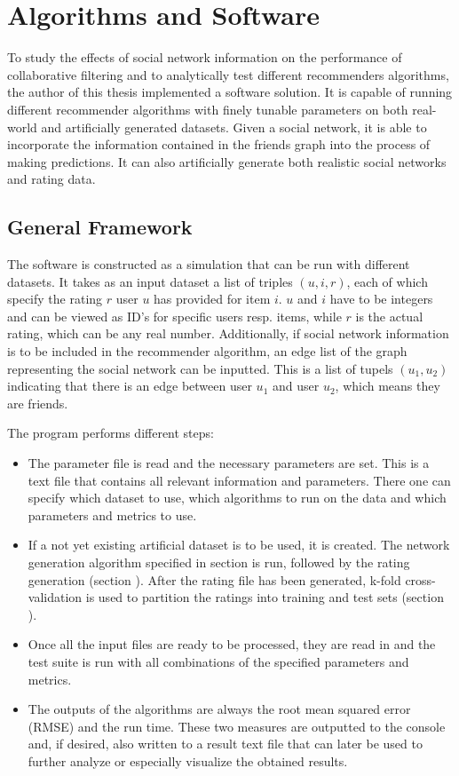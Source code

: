 \chapter{Algorithms and Software}
\label{c:algorithmssoftware} To study the effects of social network information on the performance of collaborative filtering and to analytically test different recommenders algorithms, the author of this thesis implemented a software solution. It is capable of running different recommender algorithms with finely tunable parameters on both real-world and artificially generated datasets. Given a social network, it is able to incorporate the information contained in the friends graph into the process of making predictions. It can also artificially generate both realistic social networks and rating data.

\section{General Framework}
\label{st:generalframework} The software is constructed as a simulation that can be run with different datasets. It takes as an input dataset a list of triples $(u, i, r)$, each of which specify the rating $r$ user $u$ has provided for item $i$. $u$ and $i$ have to be integers and can be viewed as ID's for specific users resp. items, while $r$ is the actual rating, which can be any real number. Additionally, if social network information is to be included in the recommender algorithm, an edge list of the graph representing the social network can be inputted. This is a list of tupels $(u_1,u_2)$ indicating that there is an edge between user $u_1$ and user $u_2$, which means they are friends.

The program performs different steps:
\begin{itemize}
\item The parameter file is read and the necessary parameters are set. This is a text file that contains all relevant information and parameters. There one can specify which dataset to use, which algorithms to run on the data and which parameters and metrics to use.
\item If a not yet existing artificial dataset is to be used, it is created. The network generation algorithm specified in section %
is run, followed by the rating generation (section %
). After the rating file has been generated, k-fold cross-validation is used to partition the ratings into training and test sets (section %
).
\item Once all the input files are ready to be processed, they are read in and the test suite is run with all combinations of the specified parameters and metrics.
\item The outputs of the algorithms are always the root mean squared error (RMSE) and the run time. These two measures are outputted to the console and, if desired, also written to a result text file that can later be used to further analyze or especially visualize the obtained results.
\end{itemize}

